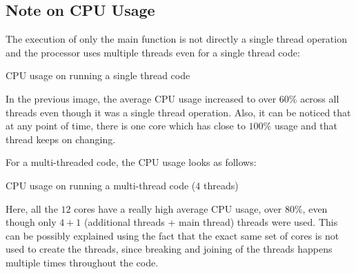 \documentclass{article}
\begin{document}
\subsection{Note on CPU Usage}
The execution of only the main function is not directly a single thread operation and the processor uses multiple threads even for a single thread code:
\begin{center}
    CPU usage on running a single thread code
\end{center}
In the previous image, the average CPU usage increased to over $60\%$ across all threads even though it was a single thread operation. Also, it can be noticed that at any point of time, there is one core which has close to $100\%$ usage and that thread keeps on changing.\par
For a multi-threaded code, the CPU usage looks as follows:
\begin{center}
    CPU usage on running a multi-thread code ($4$ threads)
\end{center}
Here, all the $12$ cores have a really high average CPU usage, over $80\%$, even though only $4+1$ (additional threads + main thread) threads were used. This can be possibly explained using the fact that the exact same set of cores is not used to create the threads, since breaking and joining of the threads happens multiple times throughout the code.
\end{document}
